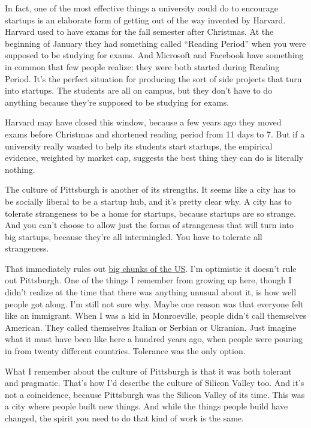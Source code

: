 In fact, one of the most effective things a university could do to
encourage startups is an elaborate form of getting out of the way
invented by Harvard. Harvard used to have exams for the fall semester
after Christmas. At the beginning of January they had something called
``Reading Period'' when you were supposed to be studying for exams. And
Microsoft and Facebook have something in common that few people realize:
they were both started during Reading Period. It's the perfect situation
for producing the sort of side projects that turn into startups. The
students are all on campus, but they don't have to do anything because
they're supposed to be studying for exams.

Harvard may have closed this window, because a few years ago they moved
exams before Christmas and shortened reading period from 11 days to 7.
But if a university really wanted to help its students start startups,
the empirical evidence, weighted by market cap, suggests the best thing
they can do is literally nothing.

The culture of Pittsburgh is another of its strengths. It seems like a
city has to be socially liberal to be a startup hub, and it's pretty
clear why. A city has to tolerate strangeness to be a home for startups,
because startups are so strange. And you can't choose to allow just the
forms of strangeness that will turn into big startups, because they're
all intermingled. You have to tolerate all strangeness.

That immediately rules out
\href{http://www.nytimes.com/2016/04/06/us/gay-rights-mississippi-north-carolina.html}{big
chunks of the US}. I'm optimistic it doesn't rule out Pittsburgh. One of
the things I remember from growing up here, though I didn't realize at
the time that there was anything unusual about it, is how well people
got along. I'm still not sure why. Maybe one reason was that everyone
felt like an immigrant. When I was a kid in Monroeville, people didn't
call themselves American. They called themselves Italian or Serbian or
Ukranian. Just imagine what it must have been like here a hundred years
ago, when people were pouring in from twenty different countries.
Tolerance was the only option.

What I remember about the culture of Pittsburgh is that it was both
tolerant and pragmatic. That's how I'd describe the culture of Silicon
Valley too. And it's not a coincidence, because Pittsburgh was the
Silicon Valley of its time. This was a city where people built new
things. And while the things people build have changed, the spirit you
need to do that kind of work is the same.

